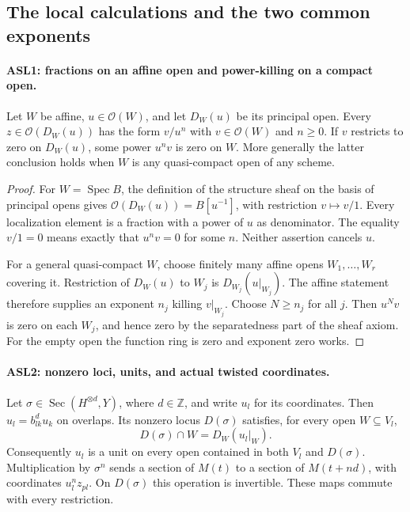 \documentclass[11pt,a4paper]{article}
\numberwithin{equation}{section}
\theoremstyle{remark}\newtheorem{remark}[theorem]{Remark}
\begin{document}
\subsection{The local calculations and the two common exponents}

\paragraph{ASL1: fractions on an affine open and power-killing on a compact open.}
\label{claim:ASL1}
Let $W$ be affine, $u\in\mathcal O(W)$, and let $D_W(u)$ be its
principal open.  Every $z\in\mathcal O(D_W(u))$ has the form
$v/u^n$ with $v\in\mathcal O(W)$ and $n\ge0$.  If $v$ restricts
to zero on $D_W(u)$, some power $u^nv$ is zero on $W$.
More generally the latter conclusion holds when $W$ is any
quasi-compact open of any scheme.

\begin{proof}
For $W=\operatorname{Spec}B$, the definition of the structure sheaf
on the basis of principal opens gives
$\mathcal O(D_W(u))=B[u^{-1}]$, with restriction $v\mapsto v/1$.
Every localization element is a fraction with a power of $u$ as
denominator.  The equality $v/1=0$ means exactly that
$u^nv=0$ for some $n$.  Neither assertion cancels $u$.

For a general quasi-compact $W$, choose finitely many affine opens
$W_1,\ldots,W_r$ covering it.  Restriction of $D_W(u)$ to $W_j$
is $D_{W_j}(u|_{W_j})$.  The affine statement therefore supplies
an exponent $n_j$ killing $v|_{W_j}$.  Choose $N\ge n_j$ for all
$j$.  Then $u^Nv$ is zero on each $W_j$, and hence zero by the
separatedness part of the sheaf axiom.  For the empty open the
function ring is zero and exponent zero works.
\end{proof}

\paragraph{ASL2: nonzero loci, units, and actual twisted coordinates.}
\label{claim:ASL2}
Let $\sigma\in\operatorname{Sec}(H^{\otimes d},Y)$, where
$d\in\mathbb Z$, and write $u_l$ for its coordinates.  Then
$u_l=b_{lk}^{d}u_k$ on overlaps.  Its nonzero locus $D(\sigma)$
satisfies, for every open $W\subseteq V_l$,
\[
 D(\sigma)\cap W=D_W(u_l|_W).                       \tag{ASL.3}
\]
Consequently $u_l$ is a unit on every open contained in both
$V_l$ and $D(\sigma)$.  Multiplication by $\sigma^n$ sends a
section of $M(t)$ to a section of $M(t+nd)$, with coordinates
$u_l^nz_{pl}$.  On $D(\sigma)$ this operation is invertible.
These maps commute with every restriction.
\end{document}
